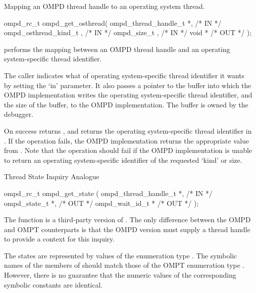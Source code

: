 \summary
Mapping an OMPD thread handle to an operating system thread.
\format
\ccppspecificstart
\begin{boxedcode}
ompd\_rc\_t ompd\_get\_osthread(
  ompd\_thread\_handle\_t *,                             /* IN */
  ompd\_osthread\_kind\_t ,                                      /* IN */
  ompd\_size\_t ,                           /* IN */
  void  *                                  /* OUT */
);
\end{boxedcode}
\ccppspecificend

\descr
{} performs the mapping between an OMPD
thread handle and an operating system-specific thread identifier.

\argdesc
The caller indicates what  of operating system-specific thread
identifier it wants by setting the 
`in' parameter.
It also passes a pointer to the buffer into which the OMPD
implementation writes the operating system-specific thread identifier,
and the size of the buffer, to the OMPD implementation.
The buffer is owned by the debugger.

On success  returns ,
and returns the operating system-specific thread identifier in
.
If the operation fails, the OMPD implementation returns
the appropriate value from .
Note that the operation should fail if the OMPD implementation is
unable to return an operating system-specific identifier of the
requested `kind' or size.

\crossreferences



\summary
Thread State Inquiry Analogue
\format
\ccppspecificstart
\begin{boxedcode}
ompd\_rc\_t ompd\_get\_state (
  ompd\_thread\_handle\_t *,                             /* IN */
  ompd\_state\_t *,                                    /* OUT */
  ompd\_wait\_id\_t    *                                   /* OUT */
);
\end{boxedcode}
\ccppspecificend

\descr
The function  is a  third-party version of
. 
The only difference between the OMPD and OMPT counterparts
is that the OMPD version must supply a thread handle to provide
a context for this inquiry.

\argdesc
The states are represented by values of the enumeration type
.
The symbolic names of the members of  should
match those of the OMPT enumeration type .
However, there is no guarantee that the numeric values of the corresponding
symbolic constants are identical.

\crossreferences

